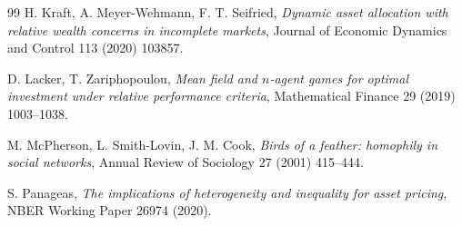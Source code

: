 \begin{thebibliography}{99}
 H. Kraft, A. Meyer-Wehmann, F. T. Seifried,
\emph{Dynamic asset allocation with relative wealth concerns in incomplete
markets},
Journal of Economic Dynamics and Control 113 (2020) 103857.

 D. Lacker, T. Zariphopoulou,
\emph{Mean field and $n$-agent games for optimal investment under relative
performance criteria},
Mathematical Finance 29 (2019) 1003--1038.

 M. McPherson, L. Smith-Lovin, J. M. Cook,
\emph{Birds of a feather: homophily in social networks},
Annual Review of Sociology 27 (2001) 415--444.

 S. Panageas,
\emph{The implications of heterogeneity and inequality for asset pricing},
NBER Working Paper 26974 (2020).

\end{thebibliography}
